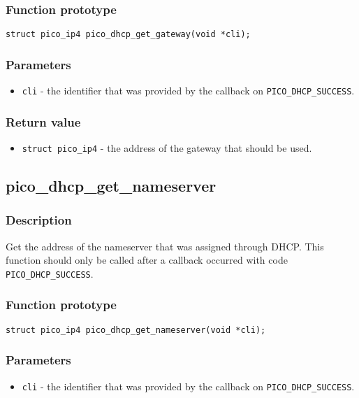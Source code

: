 \subsubsection*{Function prototype}
\texttt{struct pico\_ip4 pico\_dhcp\_get\_gateway(void *cli);}

\subsubsection*{Parameters}
\begin{itemize}[noitemsep]
\item \texttt{cli} - the identifier that was provided by the callback on \texttt{PICO\_DHCP\_SUCCESS}.
\end{itemize}

\subsubsection*{Return value}
\begin{itemize}[noitemsep]
\item \texttt{struct pico\_ip4} - the address of the gateway that should be used. 
\end{itemize}

\subsection{pico\_dhcp\_get\_nameserver}

\subsubsection*{Description}
Get the address of the nameserver that was assigned through DHCP. This function should
only be called after a callback occurred with code \texttt{PICO\_DHCP\_SUCCESS}. 

\subsubsection*{Function prototype}
\texttt{struct pico\_ip4 pico\_dhcp\_get\_nameserver(void *cli);}

\subsubsection*{Parameters}
\begin{itemize}[noitemsep]
\item \texttt{cli} - the identifier that was provided by the callback on \texttt{PICO\_DHCP\_SUCCESS}.
\end{itemize}

